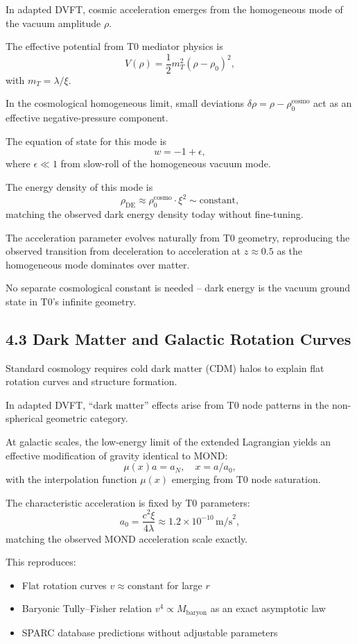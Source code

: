 	In adapted DVFT, cosmic acceleration emerges from the homogeneous mode of the vacuum amplitude $\rho$.
	
	The effective potential from T0 mediator physics is
	\[
	V(\rho) = \frac{1}{2} m_T^2 (\rho - \rho_0)^2,
	\]
	with $m_T = \lambda / \xi$.
	
	In the cosmological homogeneous limit, small deviations $\delta \rho = \rho - \rho_0^{\text{cosmo}}$ act as an effective negative-pressure component.
	
	The equation of state for this mode is
	\[
	w = -1 + \epsilon,
	\]
	where $\epsilon \ll 1$ from slow-roll of the homogeneous vacuum mode.
	
	The energy density of this mode is
	\[
	\rho_{\text{DE}} \approx \rho_0^{\text{cosmo}} \cdot \xi^2 \sim \text{constant},
	\]
	matching the observed dark energy density today without fine-tuning.
	
	The acceleration parameter evolves naturally from T0 geometry, reproducing the observed transition from deceleration to acceleration at $z \approx 0.5$ as the homogeneous mode dominates over matter.
	
	No separate cosmological constant is needed – dark energy is the vacuum ground state in T0's infinite geometry.
	
	\subsection{4.3 Dark Matter and Galactic Rotation Curves}
	
	Standard cosmology requires cold dark matter (CDM) halos to explain flat rotation curves and structure formation.
	
	In adapted DVFT, ``dark matter'' effects arise from T0 node patterns in the non-spherical geometric category.
	
	At galactic scales, the low-energy limit of the extended Lagrangian yields an effective modification of gravity identical to MOND:
	\[
	\mu(x) a = a_N, \quad x = a / a_0,
	\]
	with the interpolation function $\mu(x)$ emerging from T0 node saturation.
	
	The characteristic acceleration is fixed by T0 parameters:
	\[
	a_0 = \frac{c^2 \xi}{4 \lambda} \approx 1.2 \times 10^{-10} \, \text{m/s}^2,
	\]
	matching the observed MOND acceleration scale exactly.
	
	This reproduces:
	\begin{itemize}
		\item Flat rotation curves $v \approx \text{constant}$ for large $r$
		\item Baryonic Tully–Fisher relation $v^4 \propto M_{\text{baryon}}$ as an exact asymptotic law
		\item SPARC database predictions without adjustable parameters
	\end{itemize}
	
